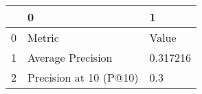\begin{tabular}{lll}
\toprule
{} &                       0 &         1 \\
\midrule
0 &                  Metric &     Value \\
1 &       Average Precision &  0.317216 \\
2 &  Precision at 10 (P@10) &       0.3 \\
\bottomrule
\end{tabular}
